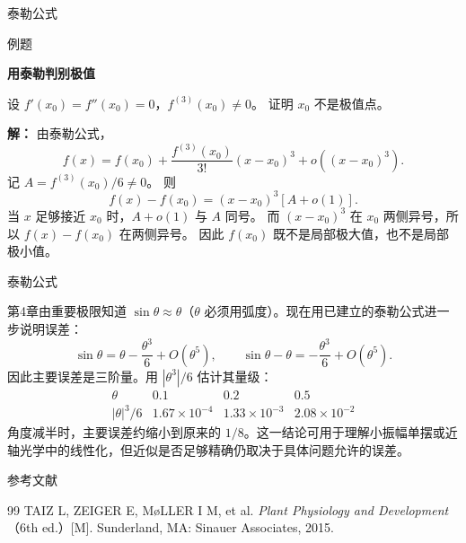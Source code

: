 \documentclass[aspectratio=169,10pt,fontset=fandol]{ctexbeamer}
\begin{document}
\begin{frame}[t,fragile]{泰勒公式}
\normalsize
\begin{block}{例题}
{\normalsize
\textbf{用泰勒判别极值}\par

设 $f'(x_0)=f''(x_0)=0$，$f^{(3)}(x_0)\neq0$。 证明 $x_0$ 不是极值点。

}
\end{block}
\pause
{\normalsize
\textbf{解：}
由泰勒公式，
\[
f(x)=f(x_0)+\frac{f^{(3)}(x_0)}{3!}(x-x_0)^3+o((x-x_0)^3).
\]
记 $A=f^{(3)}(x_0)/6\neq0$。 则
\[
f(x)-f(x_0)=(x-x_0)^3[A+o(1)].
\]
当 $x$ 足够接近 $x_0$ 时，$A+o(1)$ 与 $A$ 同号。 而 $(x-x_0)^3$ 在 $x_0$ 两侧异号，所以 $f(x)-f(x_0)$ 在两侧异号。 因此 $f(x_0)$ 既不是局部极大值，也不是局部极小值。

}
\end{frame}
\begin{frame}[t,fragile]{泰勒公式}
\normalsize
{\normalsize
\begin{application}
第4章由重要极限知道 $\sin\theta\approx\theta$（$\theta$ 必须用弧度）。现在用已建立的泰勒公式进一步说明误差：
\[
\sin\theta=\theta-\frac{\theta^3}{6}+O(\theta^5),
\qquad
\sin\theta-\theta=-\frac{\theta^3}{6}+O(\theta^5).
\]
因此主要误差是三阶量。用 $|\theta^3|/6$ 估计其量级：
\[
\begin{array}{c|ccc}
\theta&0.1&0.2&0.5\\ \hline
|\theta|^3/6&1.67\times10^{-4}&1.33\times10^{-3}&2.08\times10^{-2}
\end{array}
\]
角度减半时，主要误差约缩小到原来的 $1/8$。这一结论可用于理解小振幅单摆或近轴光学中的线性化，但近似是否足够精确仍取决于具体问题允许的误差。
\end{application}
}
\end{frame}
\begin{frame}[t,fragile]{参考文献}
\normalsize
{\normalsize
\begin{thebibliography}{99}
 TAIZ L, ZEIGER E, M{\o}LLER I M, et al. \emph{Plant Physiology and Development}（6th ed.）[M]. Sunderland, MA: Sinauer Associates, 2015.
\end{thebibliography}
}
\end{frame}
\end{document}
